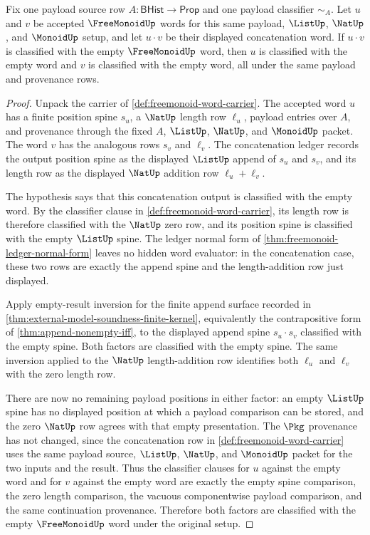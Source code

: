 \begin{theorem}
\label{thm:freemonoid-empty-concat-inversion}
Fix one payload source row $A:\mathsf{BHist}\to\mathsf{Prop}$ and one
payload classifier $\sim_A$. Let $u$ and $v$ be accepted $\FreeMonoidUp$ words
for this same payload, $\ListUp$, $\NatUp$, and $\MonoidUp$ setup, and let
$u\cdot v$ be their displayed concatenation word. If $u\cdot v$ is classified
with the empty $\FreeMonoidUp$ word, then $u$ is classified with the empty word
and $v$ is classified with the empty word, all under the same payload and
provenance rows.
\end{theorem}
\begin{proof}
Unpack the carrier of \autoref{def:freemonoid-word-carrier}. The accepted word
$u$ has a finite position spine $s_u$, a $\NatUp$ length row $\ell_u$, payload
entries over $A$, and provenance through the fixed $A$, $\ListUp$, $\NatUp$, and
$\MonoidUp$ packet. The word $v$ has the analogous rows $s_v$ and $\ell_v$. The
concatenation ledger records the output position spine as the displayed
$\ListUp$ append of $s_u$ and $s_v$, and its length row as the displayed
$\NatUp$ addition row $\ell_u+\ell_v$.

The hypothesis says that this concatenation output is classified with the empty
word. By the classifier clause in \autoref{def:freemonoid-word-carrier}, its
length row is therefore classified with the $\NatUp$ zero row, and its position
spine is classified with the empty $\ListUp$ spine. The ledger normal form of
\autoref{thm:freemonoid-ledger-normal-form} leaves no hidden word evaluator: in
the concatenation case, these two rows are exactly the append spine and the
length-addition row just displayed.

Apply empty-result inversion for the finite append surface recorded in
\autoref{thm:external-model-soundness-finite-kernel}, equivalently the
contrapositive form of \autoref{thm:append-nonempty-iff}, to the displayed
append spine $s_u\cdot s_v$ classified with the empty spine. Both factors are
classified with the empty spine. The same inversion applied to the $\NatUp$
length-addition row identifies both $\ell_u$ and $\ell_v$ with the zero length
row.

There are now no remaining payload positions in either factor: an empty
$\ListUp$ spine has no displayed position at which a payload comparison can be
stored, and the zero $\NatUp$ row agrees with that empty presentation. The
$\Pkg$ provenance has not changed, since the concatenation row in
\autoref{def:freemonoid-word-carrier} uses the same payload source, $\ListUp$,
$\NatUp$, and $\MonoidUp$ packet for the two inputs and the result. Thus the
classifier clauses for $u$ against the empty word and for $v$ against the empty
word are exactly the empty spine comparison, the zero length comparison, the
vacuous componentwise payload comparison, and the same continuation provenance.
Therefore both factors are classified with the empty $\FreeMonoidUp$ word under
the original setup.
\end{proof}

